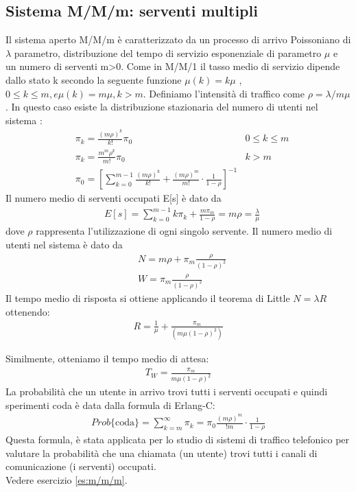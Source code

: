 \subsection{Sistema M/M/m: serventi multipli}
Il sistema aperto M/M/m è caratterizzato da un processo di arrivo Poissoniano di $\lambda$
parametro, distribuzione del tempo di servizio esponenziale di parametro $\mu$ e un
numero di serventi m>0. Come in M/M/1  il tasso medio di servizio dipende dallo stato k secondo la seguente funzione $\mu(k) = k \mu$ ,$0\leq k\leq m, e \mu(k) = m \mu, k>m$.  Definiamo l’intensità di traffico come $\rho =\lambda/ m\mu$. In questo caso esiste la distribuzione stazionaria del numero di utenti nel sistema :
\begin{align}
    & \pi_k = \frac{(m\rho)^k}{k!}\pi_0 & 0\leq k \leq m \\
    &\pi_k = \frac{m^m \rho^k}{m!}\pi_0 & k>m \\
    &\pi_0 = \left [  \sum_{k=0}^{m-1} \frac{(m\rho)^k}{k!} +  \frac{(m\rho)^m}{m!}\cdot \frac{1}{1-\rho} \right ]^{-1}
\end{align}
Il numero medio di serventi occupati E[s] è dato da
\begin{align}
    & E[s] = \sum_{k=0}^{m-1} k \pi_k + \frac{m\pi_m}{1-\rho} = m\rho = \frac{\lambda}{\mu}
\end{align}
dove $\rho$ rappresenta l’utilizzazione di ogni singolo servente.
Il numero medio di utenti nel sistema è dato da
\begin{align}
    & N = m \rho + \pi_m \frac{\rho}{(1-\rho)^2} \\
    & W = \pi_m \frac{\rho}{(1-\rho)^2}
\end{align}
Il tempo medio di risposta si ottiene applicando il teorema di Little $N=\lambda R$ ottenendo:
\begin{align}
    R = \frac{1}{\mu} + \frac{\pi_m}{(m\mu(1-\rho)^2)}
\end{align}

Similmente, otteniamo il tempo medio di attesa:
\begin{align}
    T_W = \frac{\pi_m}{m\mu ( 1-\rho)^2}
\end{align}
La probabilità che un utente in arrivo trovi tutti i serventi occupati e quindi
sperimenti coda è data dalla formula di Erlang-C:
\begin{align}
    Prob\{\textrm{coda}\} = \sum_{k=m}^{\infty}\pi_k = \pi_0 \frac{(m\rho)^m}{!m} \cdot \frac{1}{1-\rho}
\end{align}
Questa formula, è stata applicata per lo studio di sistemi di traffico telefonico per valutare la probabilità che una chiamata (un utente) trovi tutti i canali di comunicazione (i serventi) occupati.
\\
Vedere esercizio \ref{es:m/m/m}.

